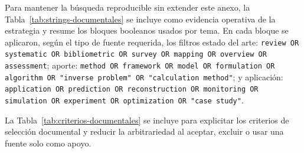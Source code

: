 \documentclass[11pt,a4paper,oneside]{report}
\begin{document}
\begin{singlespace}
Para mantener la búsqueda reproducible sin extender este anexo, la Tabla~\ref{tab:strings-documentales} se incluye como evidencia operativa de la estrategia y resume los bloques booleanos usados por tema. En cada bloque se aplicaron, según el tipo de fuente requerida, los filtros estado del arte: \texttt{review OR systematic OR bibliometric OR survey OR mapping OR overview OR assessment}; aporte: \texttt{method OR framework OR model OR formulation OR algorithm OR "inverse problem" OR "calculation method"}; y aplicación: \texttt{application OR prediction OR reconstruction OR monitoring OR simulation OR experiment OR optimization OR "case study"}.

La Tabla~\ref{tab:criterios-documentales} se incluye para explicitar los criterios de selección documental y reducir la arbitrariedad al aceptar, excluir o usar una fuente solo como apoyo.


\end{singlespace}
\end{document}
